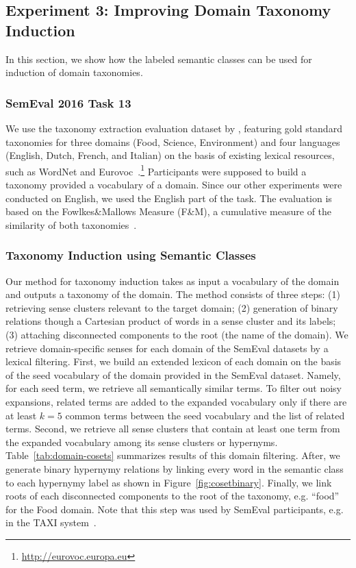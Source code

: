 \documentclass[10pt, a4paper]{article}
\begin{document}
\subsection{Experiment 3: Improving Domain Taxonomy Induction}

In this section, we show how the labeled semantic classes can be used for induction of domain taxonomies.

\subsubsection{SemEval 2016 Task 13}

We use the taxonomy extraction evaluation dataset by , featuring gold standard taxonomies for three domains (Food, Science, Environment) and four languages (English, Dutch, French, and Italian) on the basis of existing lexical resources, such as WordNet and Eurovoc~\cite{steinberger2006jrc}.\footnote{\url{http://eurovoc.europa.eu}} Participants were supposed to build a taxonomy provided a vocabulary of a domain. Since our other experiments were conducted on English, we used the English part of the task. The evaluation is based on the Fowlkes\&Mallows Measure (F\&M), a cumulative measure of the similarity of both taxonomies~\cite{velardi2013ontolearn}. 

\subsubsection{Taxonomy Induction using Semantic Classes}

Our method for taxonomy induction takes as input a vocabulary of the domain and outputs a taxonomy of the domain. The method consists of three steps: (1) retrieving sense clusters relevant to the target domain; (2) generation of binary relations though a Cartesian product of words in a sense cluster and its labels; (3) attaching disconnected components to the root (the name of the domain). We retrieve domain-specific senses for each domain of the SemEval datasets by a  lexical filtering. First, we build an extended lexicon of each domain on the basis of the seed vocabulary of the domain provided in the SemEval dataset. Namely, for each seed term, we retrieve all semantically similar terms. To filter out noisy expansions, related terms are added to the expanded vocabulary only if there are at least $k=5$ common terms between the seed vocabulary and the list of related terms. Second, we retrieve all sense clusters that contain at least one term from the expanded vocabulary among its sense clusters or hypernyms. Table~\ref{tab:domain-cosets} summarizes results of this domain filtering. 
After, we generate binary hypernymy relations by linking every word in the semantic class to each hypernymy label as shown in Figure~\ref{fig:cosetbinary}. Finally, we link roots of each disconnected components to the root of the taxonomy, e.g. ``food'' for the Food domain. Note that this step was used by SemEval participants, e.g. in the TAXI system~\cite{panchenko-EtAl:2016:SemEval}. 
\end{document}

